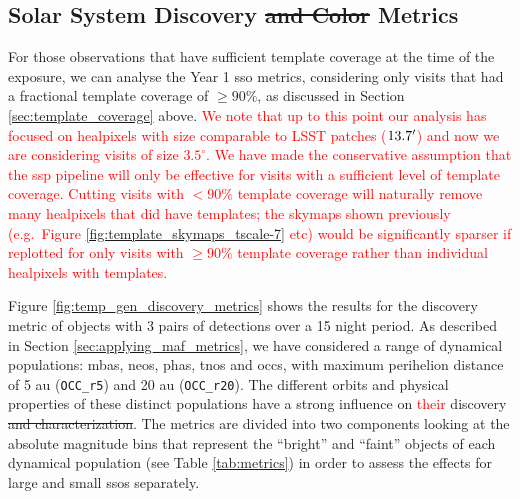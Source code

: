 \documentclass[preprintm,linenumbers]{aastex631}
\newcommand{\occrfive}{\texttt{OCC\_r5}\xspace}
\newcommand{\occrtwenty}{\texttt{OCC\_r20}\xspace}
\providecommand{\red}[1]{\textcolor{red}{#1}}
\begin{document}
		\subsection{Solar System Discovery \sout{and Color} Metrics}
		\label{sec:sso_metrics}
		    For those observations that have sufficient template coverage at the time of the exposure, we can analyse the Year 1 \gls*{sso} metrics, considering only visits that had a fractional template coverage of $\geq 90 \%$, as discussed in Section \ref{sec:template_coverage} above.	
            \red{We note that up to this point our analysis has focused on healpixels with size comparable to LSST patches ($13.7\mbox{$^\prime$}$) and now we are considering visits of size $3.5^\circ$.
            We have made the conservative assumption that the \gls*{ssp} pipeline will only be effective for visits with a sufficient level of template coverage.
            Cutting visits with $<90 \%$ template coverage will naturally remove many healpixels that did have templates; the skymaps shown previously (e.g.\ Figure \ref{fig:template_skymaps_tscale-7} etc) would be significantly sparser if replotted for only visits with $\geq90 \%$ template coverage rather than individual healpixels with templates.}
            
		Figure \ref{fig:temp_gen_discovery_metrics} shows the results for the discovery metric of objects with 3 pairs of detections over a 15 night period.
		As described in Section \ref{sec:applying_maf_metrics}, we have considered a range of dynamical populations: \glspl*{mba}, \glspl*{neo}, \glspl*{pha}, \glspl*{tno} and \glspl*{occ}, with maximum perihelion distance of 5 au (\occrfive) and 20 au (\occrtwenty).
  The different orbits and physical properties of these distinct populations have a strong influence on \red{their} discovery \sout{and characterization}.
  The metrics are divided into two components looking at the absolute magnitude bins that represent the ``bright'' and ``faint'' objects of each dynamical population (see Table \ref{tab:metrics}) in order to assess the effects for large and small \glspl*{sso} separately.
		
\end{document}

